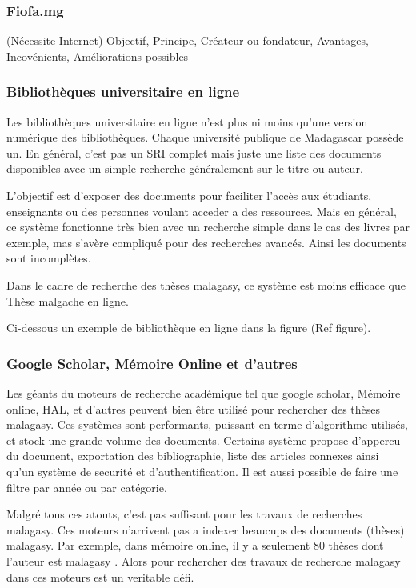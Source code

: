 \subsubsection{Fiofa.mg}
(Nécessite Internet)
Objectif, Principe, Créateur ou fondateur, Avantages, Incovénients, Améliorations possibles

\subsubsection{Bibliothèques universitaire en ligne}
Les bibliothèques universitaire en ligne n'est plus ni moins qu'une version numérique des bibliothèques. Chaque université publique de Madagascar possède un. En général, c'est pas un SRI complet mais juste une liste des documents disponibles avec un simple recherche généralement sur le titre ou auteur. 

L'objectif est d'exposer des documents pour faciliter l'accès aux étudiants, enseignants ou des personnes voulant acceder a des ressources. Mais en général, ce système fonctionne très bien avec un recherche simple dans le cas des livres par exemple, mas s'avère compliqué pour des recherches avancés. Ainsi les documents sont incomplètes. 

Dans le cadre de recherche des thèses malagasy, ce système est moins efficace que Thèse malgache en ligne.

Ci-dessous un exemple de bibliothèque en ligne dans la figure (Ref figure).

\subsubsection{Google Scholar, Mémoire Online et d'autres}
Les géants du moteurs de recherche académique tel que google scholar, Mémoire online, HAL, et d'autres peuvent bien être utilisé pour rechercher des thèses malagasy. Ces systèmes sont performants, puissant en terme d'algorithme utilisés, et stock une grande volume des documents. Certains système propose d'appercu du document, exportation des bibliographie, liste des articles connexes ainsi qu'un système de securité et d'authentification. Il est aussi possible de faire une filtre par année ou par catégorie.

Malgré tous ces atouts, c'est pas suffisant pour les travaux de recherches malagasy. Ces moteurs n'arrivent pas a indexer beaucups des documents (thèses) malagasy. Par exemple, dans mémoire online, il y a seulement 80 thèses dont l'auteur est malagasy \citep{memoire-online}. Alors pour rechercher des travaux de recherche malagasy dans ces moteurs est un veritable défi.

